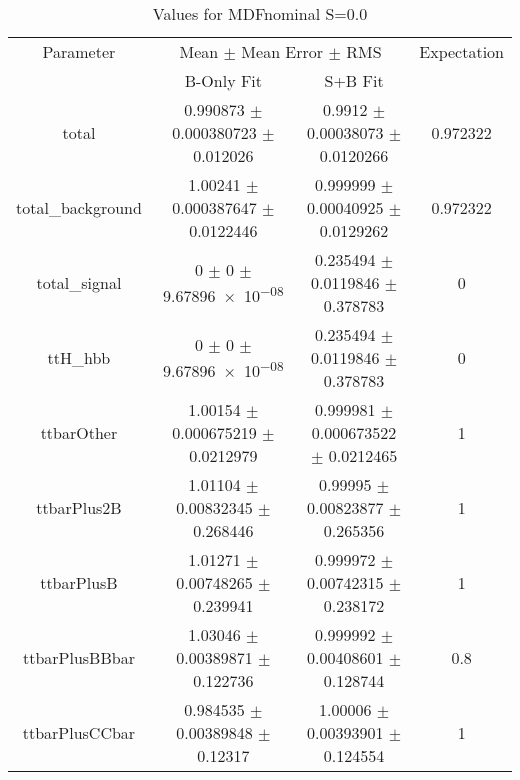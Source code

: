 \begin{table}
\centering
\caption{Values for MDFnominal S=0.0}
\begin{tabular}{cccc}
\toprule
Parameter & \multicolumn{2}{c}{Mean $\pm$ Mean Error $\pm$ RMS} & Expectation\\
 & B-Only Fit & S+B Fit & \\
\midrule
total & \num{0.990873} $\pm$ \num{0.000380723} $\pm$ \num{0.012026} & \num{0.9912} $\pm$ \num{0.00038073} $\pm$ \num{0.0120266} & \num{0.972322}\\
total\_background & \num{1.00241} $\pm$ \num{0.000387647} $\pm$ \num{0.0122446} & \num{0.999999} $\pm$ \num{0.00040925} $\pm$ \num{0.0129262} & \num{0.972322}\\
total\_signal & \num{0} $\pm$ \num{0} $\pm$ \num{9.67896e-08} & \num{0.235494} $\pm$ \num{0.0119846} $\pm$ \num{0.378783} & \num{0}\\
ttH\_hbb & \num{0} $\pm$ \num{0} $\pm$ \num{9.67896e-08} & \num{0.235494} $\pm$ \num{0.0119846} $\pm$ \num{0.378783} & \num{0}\\
ttbarOther & \num{1.00154} $\pm$ \num{0.000675219} $\pm$ \num{0.0212979} & \num{0.999981} $\pm$ \num{0.000673522} $\pm$ \num{0.0212465} & \num{1}\\
ttbarPlus2B & \num{1.01104} $\pm$ \num{0.00832345} $\pm$ \num{0.268446} & \num{0.99995} $\pm$ \num{0.00823877} $\pm$ \num{0.265356} & \num{1}\\
ttbarPlusB & \num{1.01271} $\pm$ \num{0.00748265} $\pm$ \num{0.239941} & \num{0.999972} $\pm$ \num{0.00742315} $\pm$ \num{0.238172} & \num{1}\\
ttbarPlusBBbar & \num{1.03046} $\pm$ \num{0.00389871} $\pm$ \num{0.122736} & \num{0.999992} $\pm$ \num{0.00408601} $\pm$ \num{0.128744} & \num{0.8}\\
ttbarPlusCCbar & \num{0.984535} $\pm$ \num{0.00389848} $\pm$ \num{0.12317} & \num{1.00006} $\pm$ \num{0.00393901} $\pm$ \num{0.124554} & \num{1}\\
\bottomrule
\end{tabular}
\end{table}